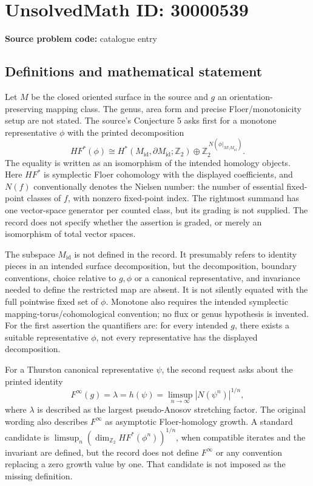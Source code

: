 \documentclass[11pt]{article}
\newcommand{\Z}{\mathbb{Z}}
\begin{document}
\section*{UnsolvedMath ID: 30000539}
\textbf{Source problem code:} catalogue entry
\subsection{Definitions and mathematical statement}
Let \(M\) be the closed oriented surface in the source and \(g\) an orientation-preserving mapping class. The genus, area form and precise Floer/monotonicity setup are not stated. The source's Conjecture 5 asks first for a monotone representative \(\phi\) with the printed decomposition
\[
 HF^*(\phi)\cong H^*(M_{\mathrm{id}},\partial M_{\mathrm{id}};\Z_2)
 \oplus\Z_2^{\,N(\phi|_{M\setminus M_{\mathrm{id}}})}.
\]
The equality is written as an isomorphism of the intended homology objects. Here \(HF^*\) is symplectic Floer cohomology with the displayed coefficients, and \(N(f)\) conventionally denotes the Nielsen number: the number of essential fixed-point classes of \(f\), with nonzero fixed-point index. The rightmost summand has one vector-space generator per counted class, but its grading is not supplied. The record does not specify whether the assertion is graded, or merely an isomorphism of total vector spaces.

The subspace \(M_{\mathrm{id}}\) is not defined in the record. It presumably refers to identity pieces in an intended surface decomposition, but the decomposition, boundary conventions, choice relative to \(g,\phi\) or a canonical representative, and invariance needed to define the restricted map are absent. It is not silently equated with the full pointwise fixed set of \(\phi\). Monotone also requires the intended symplectic mapping-torus/cohomological convention; no flux or genus hypothesis is invented. For the first assertion the quantifiers are: for every intended \(g\), there exists a suitable representative \(\phi\), not every representative has the displayed decomposition.

For a Thurston canonical representative \(\psi\), the second request asks about the printed identity
\[
 F^\infty(g)=\lambda=h(\psi)
 =\limsup_{n\to\infty}|N(\psi^n)|^{1/n},
\]
where \(\lambda\) is described as the largest pseudo-Anosov stretching factor. The original wording also describes \(F^\infty\) as asymptotic Floer-homology growth. A standard candidate is \(\limsup_n(\dim_{\Z_2}HF^*(\phi^n))^{1/n}\), when compatible iterates and the invariant are defined, but the record does not define \(F^\infty\) or any convention replacing a zero growth value by one. That candidate is not imposed as the missing definition.
\end{document}
